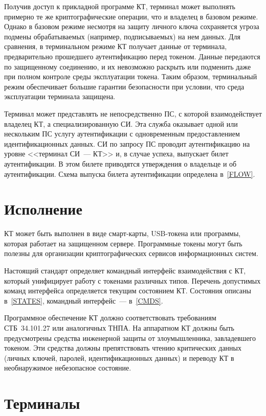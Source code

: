 Получив доступ к прикладной программе КТ, терминал может выполнять примерно те 
же криптографические операции, что и владелец в базовом режиме. Однако в 
базовом режиме несмотря на защиту личного ключа сохраняется угроза подмены 
обрабатываемых (например, подписываемых) на нем данных. Для сравнения, в 
терминальном режиме КТ получает данные от терминала, предварительно прошедшего 
аутентификацию перед токеном. Данные передаются по защищенному соединению, и их 
невозможно раскрыть или подменить даже при полном контроле среды эксплуатации 
токена. Таким образом, терминальный режим обеспечивает большие гарантии 
безопасности при условии, что среда эксплуатации терминала защищена.

Терминал может представлять не непосредственно ПС, с которой взаимодействует 
владелец КТ, а специализированную СИ. Эта служба оказывает одной или 
нескольким ПС услугу аутентификации с одновременным предоставлением 
идентификационных данных.
%
СИ по запросу ПС проводит аутентификацию на уровне 
<<терминал СИ~--- КТ>> и, в случае успеха, выпускает билет аутентификации. В 
этом билете приводятся утверждения о владельце и об аутентификации. 
Схема выпуска билета аутентификации определена в~\ref{FLOW}.

\section{Исполнение} 

КТ может быть выполнен в виде смарт-карты, USB-токена 
или программы, которая работает на защищенном сервере. 
Программные токены могут быть полезны для организации криптографических 
сервисов информационных систем. 

Настоящий стандарт определяет командный интерфейс взаимодействия с КТ, который
унифицирует работу с токенами различных типов.
%
Перечень допустимых команд интерфейса определяется текущим состоянием КТ.
%
Состояния описаны в~\ref{STATES}, командный интерфейс~--- в~\ref{CMDS}. 

Программное обеспечение КТ должно соответствовать требованиям СТБ~34.101.27  или
аналогичных ТНПА. На аппаратном КТ должны быть предусмотрены средства инженерной
защиты от злоумышленника, завладевшего токеном. Эти средства должны
препятствовать чтению критических данных (личных ключей, паролей,
идентификационных данных) и переводу КТ в необнаружимое небезопасное состояние.

\section{Терминалы}

